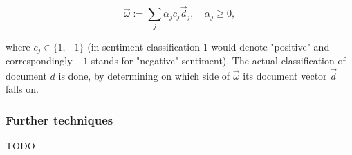 \begin{equation*}
\vec{\omega} := \sum_j \alpha_j c_j \vec{d}_j,\quad \alpha_j \geq 0,
\end{equation*}

where $c_j \in \lbrace 1, -1\rbrace$ (in sentiment classification $1$ would denote "positive" and correspondingly $-1$ stands for "negative" sentiment). The actual classification of document $d$ is done, by determining on which side of $\vec{\omega}$ its document vector $\vec{d}$ falls on.

\subsubsection*{Further techniques}

TODO